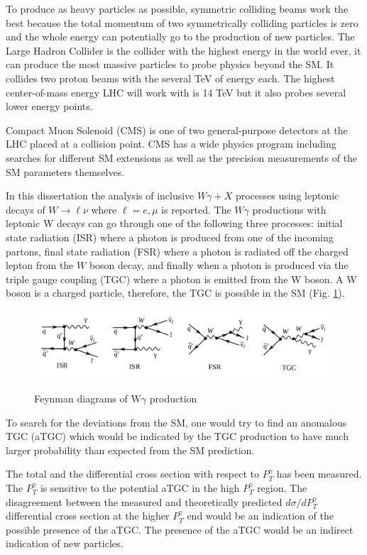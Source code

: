 To produce as heavy particles as possible, symmetric colliding beams work the best because the total momentum of two symmetrically colliding particles is zero and the whole energy can potentially go to the production of new particles. The Large Hadron Collider is the collider with the highest energy in the world ever, it can produce the most massive particles to probe physics beyond the SM. It collides two proton beams with the several TeV of energy each. The highest center-of-mass energy LHC will work with is 14 TeV but it also probes several lower energy points. 

Compact Muon Solenoid (CMS) is one of two general-purpose detectors at the LHC placed at a collision point. CMS has a wide physics program including searches for different SM extensions as well as the precision measurements of the SM parameters themselves.  

In this dissertation the analysis of inclusive $W\gamma + X$  processes using  leptonic decays of $W\to \ell\nu$ where $\ell = e, \mu$ is reported. The $W\gamma$ productions with leptonic W decays can go through one of the following three processes: initial state radiation (ISR) where a photon is produced from one of the incoming partons, final state radiation (FSR) where a photon is radiated off the charged lepton from the $W$ boson decay, and finally when a photon is produced via the triple gauge coupling (TGC) where a photon is emitted from the W boson. A W boson is a charged particle, therefore, the TGC is possible in the SM (Fig. \ref{fig:feynmWg}). 

\begin{figure}[htb]
  \begin{center}
    {\includegraphics[width=0.98\textwidth]{../figs/Intro/feynmWg.png}}
    \caption{Feynman diagrams of W$\gamma$ production}
    \label{fig:feynmWg}
  \end{center}
\end{figure}

To search for the deviations from the SM, one would try to find an anomalous TGC (aTGC) which would be indicated by the TGC production to have much larger probability than expected from the SM prediction. 

The total and the differential cross section with respect to $P_T^{\gamma}$ has been measured. The $P_T^{\gamma}$ is sensitive to the potential aTGC in the high $P_T^{\gamma}$ region. The disagreement between the measured and theoretically predicted $d\sigma/dP_T^{\gamma}$ differential cross section at the higher $P_T^{\gamma}$ end would be an indication of the possible presence of the aTGC. The presence of the aTGC would be an indirect indication of new particles.




%
%
%
%
%
%
